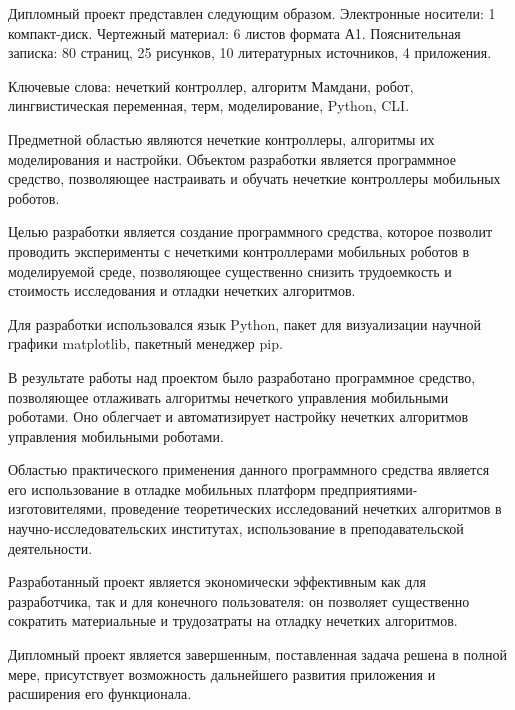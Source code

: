 \thispagestyle{empty}

Дипломный проект представлен следующим образом. Электронные
носители: 1 компакт-диск. Чертежный материал: 6 листов формата А1.
Пояснительная записка: 80 страниц, 25 рисунков, 10 литературных
источников, 4 приложения.

Ключевые слова: нечеткий контроллер, алгоритм Мамдани, робот,
лингвистическая переменная, терм, моделирование, Python, CLI.

Предметной областью являются нечеткие контроллеры, алгоритмы их
моделирования и настройки. Объектом разработки является программное
средство, позволяющее настраивать и обучать нечеткие контроллеры
мобильных роботов.

Целью разработки является создание программного средства, которое
позволит проводить эксперименты с нечеткими контроллерами мобильных
роботов в моделируемой среде, позволяющее существенно снизить
трудоемкость и стоимость исследования и отладки нечетких алгоритмов.

Для разработки использовался язык Python, пакет для визуализации
научной графики matplotlib, пакетный менеджер pip.

В результате работы над проектом было разработано программное
средство, позволяющее отлаживать алгоритмы нечеткого управления
мобильными роботами. Оно облегчает и автоматизирует настройку нечетких
алгоритмов управления мобильными роботами.

Областью практического применения данного программного средства
является его использование в отладке мобильных платформ предприятиями-
изготовителями, проведение теоретических исследований нечетких
алгоритмов в научно-исследовательских институтах, использование в
преподавательской деятельности.

Разработанный проект является экономически эффективным как для
разработчика, так и для конечного пользователя: он позволяет существенно
сократить материальные и трудозатраты на отладку нечетких алгоритмов.

Дипломный проект является завершенным, поставленная задача
решена в полной мере, присутствует возможность дальнейшего развития
приложения и расширения его функционала. 
\clearpage
